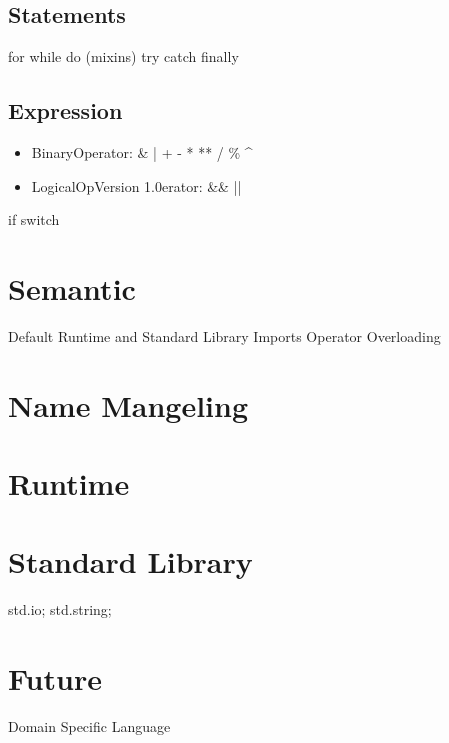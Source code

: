 \documentclass[a4paper]{article}
\begin{document}
\subsection{Statements}
for while do (mixins) try catch finally

\subsection{Expression}
\begin{itemize}
\item BinaryOperator: \& | + - * ** / \% \textasciicircum{} 
\item LogicalOpVersion 1.0erator: \&\&  ||
\end{itemize}
if 
switch

\section{Semantic}
Default Runtime and Standard Library Imports
Operator Overloading

\section{Name Mangeling}

\section{Runtime}

\section{Standard Library}
std.io;
std.string;

\section{Future}
Domain Specific Language
\end{document}
